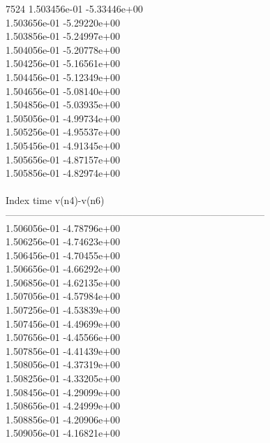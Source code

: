 7524	1.503456e-01	-5.33446e+00	\\ 	1.503656e-01	-5.29220e+00	\\ 	1.503856e-01	-5.24997e+00	\\ 	1.504056e-01	-5.20778e+00	\\ 	1.504256e-01	-5.16561e+00	\\ 	1.504456e-01	-5.12349e+00	\\ 	1.504656e-01	-5.08140e+00	\\ 	1.504856e-01	-5.03935e+00	\\ 	1.505056e-01	-4.99734e+00	\\ 	1.505256e-01	-4.95537e+00	\\ 	1.505456e-01	-4.91345e+00	\\ 	1.505656e-01	-4.87157e+00	\\ 	1.505856e-01	-4.82974e+00	\\ \hline
\\ \hline
Index   time            v(n4)-v(n6)     \\ \hline
--------------------------------------------------------------------------------\\ 	1.506056e-01	-4.78796e+00	\\ 	1.506256e-01	-4.74623e+00	\\ 	1.506456e-01	-4.70455e+00	\\ 	1.506656e-01	-4.66292e+00	\\ 	1.506856e-01	-4.62135e+00	\\ 	1.507056e-01	-4.57984e+00	\\ 	1.507256e-01	-4.53839e+00	\\ 	1.507456e-01	-4.49699e+00	\\ 	1.507656e-01	-4.45566e+00	\\ 	1.507856e-01	-4.41439e+00	\\ 	1.508056e-01	-4.37319e+00	\\ 	1.508256e-01	-4.33205e+00	\\ 	1.508456e-01	-4.29099e+00	\\ 	1.508656e-01	-4.24999e+00	\\ 	1.508856e-01	-4.20906e+00	\\ 	1.509056e-01	-4.16821e+00	\\ \hline
